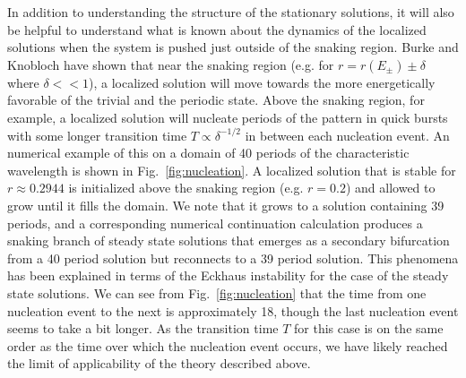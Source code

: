 \documentclass[pre,preprint,superscriptaddress]{revtex4-1}
\begin{document}
In addition to understanding the structure of the stationary solutions, it will also be helpful to understand what is known about the dynamics of the localized solutions when the system is pushed just outside of the snaking region.  Burke and Knobloch \cite{burke2006} have shown that near the snaking region (e.g. for $r=r(E_{\pm})\pm\delta$ where $\delta <<1$), a localized solution will move towards the more energetically favorable of the trivial and the periodic state.  Above the snaking region, for example, a localized solution will nucleate periods of the pattern in quick bursts with some longer transition time $T\propto \delta^{-1/2}$ in between each nucleation event.  An numerical example of this on a domain of 40 periods of the characteristic wavelength is shown in Fig.~\ref{fig:nucleation}.  A localized solution that is stable for $r\approx 0.2944$ is initialized above the snaking region (e.g. $r=0.2$) and allowed to grow until it fills the domain. We note that it grows to a solution containing 39 periods, and a corresponding numerical continuation calculation produces a snaking branch of steady state solutions that emerges as a secondary bifurcation from a 40 period solution but reconnects to a 39 period solution.  This phenomena has been explained \cite{bergeon2008} in terms of the Eckhaus instability for the case of the steady state solutions.  We can see from Fig.~\ref{fig:nucleation} that the time from one nucleation event to the next is approximately 18, though the last nucleation event seems to take a bit longer.  As the transition time $T$ for this case is on the same order as the time over which the nucleation event occurs, we have likely reached the limit of applicability of the theory described above.
\end{document}
